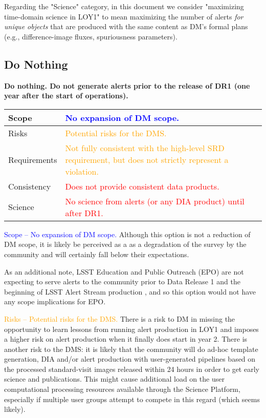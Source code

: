 \documentclass[DM,lsstdraft,toc]{lsstdoc}
\begin{document}
Regarding the "Science" category, in this document we consider "maximizing time-domain science in LOY1" to mean maximizing the number of alerts {\em for unique objects} that are produced with the same content as DM's formal plans (e.g., difference-image fluxes, spuriousness parameters). 

\clearpage
\subsection{Do Nothing}\label{ssec:potsol_donothing}

{\bf Do nothing. Do not generate alerts prior to the release of DR1 (one year after the start of operations).}

\begin{center}
\begin{tabular}{|p{2.5cm}|p{13cm}|}
\hline
Scope & \textcolor{blue}{No expansion of DM scope.} \\
\hline
Risks & \textcolor{orange}{Potential risks for the DMS.} \\
\hline
Requirements & \textcolor{orange}{Not fully consistent with the high-level SRD requirement, but does not strictly represent a violation.} \\
\hline
Consistency & \textcolor{red}{Does not provide consistent data products.} \\
\hline
Science & \textcolor{red}{No science from alerts (or any DIA product) until after DR1.} \\
\hline
\end{tabular}
\end{center}

\textcolor{blue}{ Scope -- No expansion of DM scope.} 
Although this option is not a reduction of DM scope, it is likely be perceived as a as a degradation of the survey by the community and will certainly fall below their expectations.

As an additional note, LSST Education and Public Outreach (EPO) are not expecting to serve alerts to the community prior to Data Release 1 and the beginning of LSST Alert Stream production , and so this option would not have any scope implications for EPO. 

\textcolor{orange}{ Risks -- Potential risks for the DMS.}
There is a risk to DM in missing the opportunity to learn lessons from running alert production in LOY1
and imposes a higher risk on alert production when it finally does start in year 2.
There is another risk to the DMS: it is likely that the community will do ad-hoc template generation, DIA and/or alert production with user-generated pipelines based on the processed standard-visit images released within 24 hours in order to get early science and publications.
This might cause additional load on the user computational processing resources available through the Science Platform, especially if multiple user groups attempt to compete in this regard (which seems likely).
\end{document}
